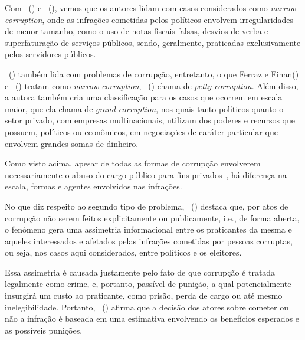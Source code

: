 \documentclass[
	12pt,				%
	openright,			%
	twoside,			%
	a4paper,			%
	openany,
	english,			%
	brazil				%
	]{abntex2}
\begin{document}
Com ~(\citeyear{ferraz2008exposing}) e ~(\citeyear{Treisman2000Jun}), vemos que os autores lidam com casos considerados como \textit{narrow corruption}, onde as infrações cometidas pelos políticos envolvem irregularidades de menor tamanho, como o uso de notas fiscais falsas, desvios de verba e superfaturação de serviços públicos, sendo, geralmente, praticadas exclusivamente pelos servidores públicos.

~(\citeyear{Rose-Ackerman1996Sep}) também lida com problemas de corrupção, entretanto, o que Ferraz e Finan(\citeyear{ferraz2008exposing}) e ~(\citeyear{Treisman2000Jun}) tratam como \textit{narrow corruption}, ~(\citeyear{Rose-Ackerman1996Sep}) chama de \textit{petty corruption}. Além disso, a autora\cite{Rose-Ackerman1996Sep} também cria uma classificação para os casos que ocorrem em escala maior, que ela chama de \textit{grand corruption}, nos quais tanto políticos quanto o setor privado, com empresas multinacionais, utilizam dos poderes e recursos que possuem, políticos ou econômicos, em negociações de caráter particular que envolvem grandes somas de dinheiro.

Como visto acima, apesar de todas as formas de corrupção envolverem necessariamente o abuso do cargo público para fins privados~\cite{gehrke2018eleiccoes}, há diferença na escala, formas e agentes envolvidos nas infrações.

No que diz respeito ao segundo tipo de problema, ~(\citeyear{gehrke2018eleiccoes}) destaca que, por atos de corrupção não serem feitos explicitamente ou publicamente, i.e., de forma aberta, o fenômeno gera uma assimetria informacional entre os praticantes da mesma e aqueles interessados e afetados pelas infrações cometidas por pessoas corruptas, ou seja, nos casos aqui considerados, entre políticos e os eleitores.

Essa assimetria é causada justamente pelo fato de que corrupção é tratada legalmente como crime, e, portanto, passível de punição, a qual potencialmente insurgirá um custo ao praticante\cite{Treisman2000Jun}, como prisão, perda de cargo ou até mesmo inelegibilidade. Portanto, ~(\citeyear{Treisman2000Jun}) afirma que a decisão dos atores sobre cometer ou não a infração é baseada em uma estimativa envolvendo os benefícios esperados e as possíveis punições.
\end{document}
